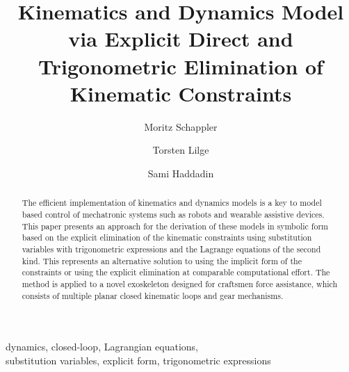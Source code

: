\documentclass{svproc}
\begin{document}
    
\mainmatter
%
\title{Kinematics and Dynamics Model via Explicit Direct and Trigonometric Elimination of Kinematic Constraints}
%
%
\author{Moritz Schappler \and Torsten Lilge \and Sami Haddadin}
%
%
%
\maketitle              %


\begin{abstract}

The efficient implementation of kinematics and dynamics models is a key to model based control of mechatronic systems such as robots and wearable assistive devices.
This paper presents an approach for the derivation of these models in symbolic form based on the explicit elimination of the kinematic constraints using substitution variables with trigonometric expressions and the Lagrange equations of the second kind.
This represents an alternative solution to using the implicit form of the constraints or using the explicit elimination at comparable computational effort.
%
The method is applied to a novel exoskeleton designed for craftsmen force assistance, which consists of multiple planar closed kinematic loops and gear mechanisms.
\end{abstract}


\begin{keywords}
dynamics, closed-loop, Lagrangian equations, \\ substitution variables, explicit form, trigonometric expressions
\end{keywords}
\end{document}
